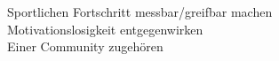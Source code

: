 Sportlichen Fortschritt messbar/greifbar machen \\
Motivationslosigkeit entgegenwirken \\
Einer Community zugehören